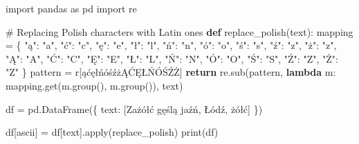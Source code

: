 \documentclass[
  english,
  letterpaper,
  DIV=11,
  numbers=noendperiod]{scrreprt}
\newenvironment{Shaded}{\begin{snugshade}}{\end{snugshade}}
\newcommand{\BuiltInTok}[1]{\textcolor[rgb]{0.00,0.23,0.31}{#1}}
\newcommand{\CommentTok}[1]{\textcolor[rgb]{0.37,0.37,0.37}{#1}}
\newcommand{\ControlFlowTok}[1]{\textcolor[rgb]{0.00,0.23,0.31}{\textbf{#1}}}
\newcommand{\ImportTok}[1]{\textcolor[rgb]{0.00,0.46,0.62}{#1}}
\newcommand{\KeywordTok}[1]{\textcolor[rgb]{0.00,0.23,0.31}{\textbf{#1}}}
\newcommand{\NormalTok}[1]{\textcolor[rgb]{0.00,0.23,0.31}{#1}}
\newcommand{\OperatorTok}[1]{\textcolor[rgb]{0.37,0.37,0.37}{#1}}
\newcommand{\PreprocessorTok}[1]{\textcolor[rgb]{0.68,0.00,0.00}{#1}}
\newcommand{\StringTok}[1]{\textcolor[rgb]{0.13,0.47,0.30}{#1}}
\newcommand{\VerbatimStringTok}[1]{\textcolor[rgb]{0.13,0.47,0.30}{#1}}
\begin{document}
\begin{Shaded}
\begin{Highlighting}[]
\ImportTok{import}\NormalTok{ pandas }\ImportTok{as}\NormalTok{ pd}
\ImportTok{import}\NormalTok{ re}

\CommentTok{\# Replacing Polish characters with Latin ones}
\KeywordTok{def}\NormalTok{ replace\_polish(text):}
\NormalTok{    mapping }\OperatorTok{=}\NormalTok{ \{}
        \StringTok{"ą"}\NormalTok{: }\StringTok{"a"}\NormalTok{, }\StringTok{"ć"}\NormalTok{: }\StringTok{"c"}\NormalTok{, }\StringTok{"ę"}\NormalTok{: }\StringTok{"e"}\NormalTok{, }\StringTok{"ł"}\NormalTok{: }\StringTok{"l"}\NormalTok{, }\StringTok{"ń"}\NormalTok{: }\StringTok{"n"}\NormalTok{,}
        \StringTok{"ó"}\NormalTok{: }\StringTok{"o"}\NormalTok{, }\StringTok{"ś"}\NormalTok{: }\StringTok{"s"}\NormalTok{, }\StringTok{"ź"}\NormalTok{: }\StringTok{"z"}\NormalTok{, }\StringTok{"ż"}\NormalTok{: }\StringTok{"z"}\NormalTok{,}
        \StringTok{"Ą"}\NormalTok{: }\StringTok{"A"}\NormalTok{, }\StringTok{"Ć"}\NormalTok{: }\StringTok{"C"}\NormalTok{, }\StringTok{"Ę"}\NormalTok{: }\StringTok{"E"}\NormalTok{, }\StringTok{"Ł"}\NormalTok{: }\StringTok{"L"}\NormalTok{, }\StringTok{"Ń"}\NormalTok{: }\StringTok{"N"}\NormalTok{,}
        \StringTok{"Ó"}\NormalTok{: }\StringTok{"O"}\NormalTok{, }\StringTok{"Ś"}\NormalTok{: }\StringTok{"S"}\NormalTok{, }\StringTok{"Ź"}\NormalTok{: }\StringTok{"Z"}\NormalTok{, }\StringTok{"Ż"}\NormalTok{: }\StringTok{"Z"}
\NormalTok{    \}}
\NormalTok{    pattern }\OperatorTok{=} \VerbatimStringTok{r\textquotesingle{}}\PreprocessorTok{[ąćęłńóśźżĄĆĘŁŃÓŚŹŻ]}\VerbatimStringTok{\textquotesingle{}}
    \ControlFlowTok{return}\NormalTok{ re.sub(pattern, }\KeywordTok{lambda}\NormalTok{ m: mapping.get(m.group(), m.group()), text)}

\NormalTok{df }\OperatorTok{=}\NormalTok{ pd.DataFrame(\{}
    \StringTok{\textquotesingle{}text\textquotesingle{}}\NormalTok{: [}\StringTok{\textquotesingle{}Zażółć gęślą jaźń\textquotesingle{}}\NormalTok{, }\StringTok{\textquotesingle{}Łódź\textquotesingle{}}\NormalTok{, }\StringTok{\textquotesingle{}żółć\textquotesingle{}}\NormalTok{]}
\NormalTok{\})}

\NormalTok{df[}\StringTok{\textquotesingle{}ascii\textquotesingle{}}\NormalTok{] }\OperatorTok{=}\NormalTok{ df[}\StringTok{\textquotesingle{}text\textquotesingle{}}\NormalTok{].}\BuiltInTok{apply}\NormalTok{(replace\_polish)}
\BuiltInTok{print}\NormalTok{(df)}
\end{Highlighting}
\end{Shaded}
\end{document}
